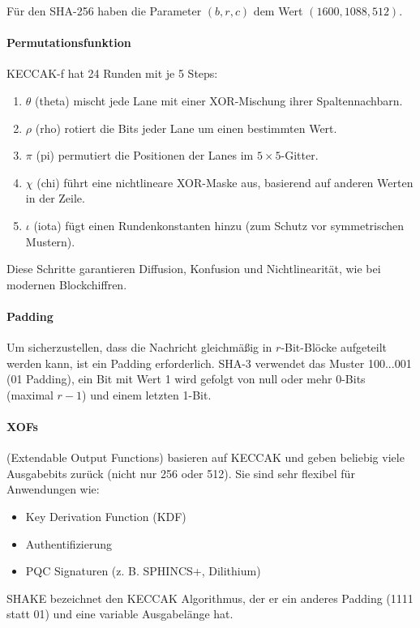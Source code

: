 Für den SHA-256 haben die Parameter $(b, r, c)$ dem Wert $(1600, 1088, 512)$.

\paragraph{Permutationsfunktion} KECCAK-f hat 24 Runden mit je 5 Steps:
\begin{enumerate}
    \item $\theta$ (theta) mischt jede Lane mit einer XOR-Mischung ihrer Spaltennachbarn.
    \item $\rho$ (rho) rotiert die Bits jeder Lane um einen bestimmten Wert.
    \item $\pi$ (pi) permutiert die Positionen der Lanes im $5\times 5$-Gitter.
    \item $\chi$ (chi) führt eine nichtlineare XOR-Maske aus, basierend auf anderen Werten in der Zeile.
    \item $\iota$ (iota) fügt einen Rundenkonstanten hinzu (zum Schutz vor symmetrischen Mustern).
\end{enumerate}

\noindent Diese Schritte garantieren Diffusion, Konfusion und Nichtlinearität, wie bei modernen
Blockchiffren.

\paragraph{Padding} Um sicherzustellen, dass die Nachricht gleichmäßig in $r$-Bit-Blöcke aufgeteilt werden
kann, ist ein Padding erforderlich. SHA-3 verwendet das Muster 100...001 (01 Padding), ein Bit mit Wert 1 wird gefolgt von null oder mehr 0-Bits (maximal $r-1$) und 
einem letzten 1-Bit.

\paragraph{XOFs} (Extendable Output Functions) basieren auf KECCAK und geben beliebig viele Ausgabebits zurück (nicht nur 256 oder 512).
Sie sind sehr flexibel für Anwendungen wie:
\begin{itemize}
    \item Key Derivation Function (KDF)
    \item Authentifizierung
    \item PQC Signaturen (z. B. SPHINCS+, Dilithium)
\end{itemize}

SHAKE bezeichnet den KECCAK Algorithmus, der er ein anderes Padding (1111 statt 01) und eine variable Ausgabelänge hat.


